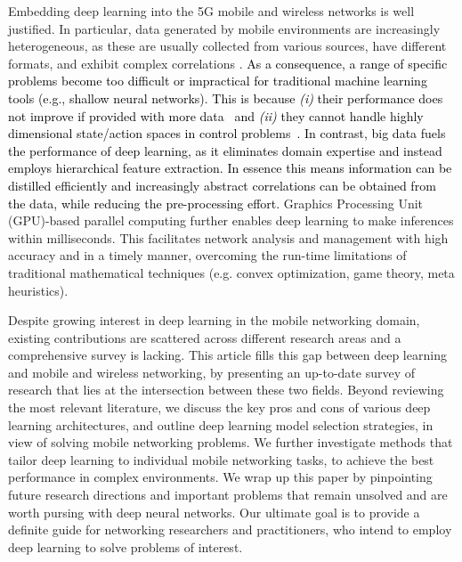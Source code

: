 \documentclass[journal,comsoc,letter]{IEEEtran}
\newcommand{\edit}[1]{\textcolor{black}{#1}}
\begin{document}
Embedding deep learning into the 5G mobile and wireless networks is well justified. In particular, data generated by mobile environments are increasingly heterogeneous, as these are usually collected from various sources, have different formats, and exhibit complex correlations \cite{alsheikh2016mobile}. 
\edit{As a consequence, a range of specific problems become too difficult or impractical for traditional machine learning tools (e.g., shallow neural networks). This is because \emph{(i)} their performance does not improve if provided with more data~\cite{goodfellow2016deep} and \emph{(ii)} they cannot handle highly dimensional state/action spaces in control problems~\cite{mnih2015human}. In contrast, big data fuels the performance of deep learning, as it eliminates domain expertise and instead employs hierarchical feature extraction. In essence this means information can be distilled efficiently and increasingly abstract correlations can be obtained from the data, while reducing the pre-processing effort.} Graphics Processing Unit (GPU)-based parallel computing further enables deep learning to make inferences within milliseconds. This facilitates network analysis and management with high accuracy and in a timely manner, overcoming the run-time limitations of traditional mathematical techniques (e.g. convex optimization, game theory, meta heuristics). 

Despite growing interest in deep learning in the mobile networking domain, existing contributions are scattered across different research areas and a comprehensive survey is lacking. This article fills this gap between deep learning and mobile and wireless networking, by presenting an up-to-date survey of research that lies at the intersection between these two fields. Beyond reviewing the most relevant literature, we discuss the key pros and cons of various deep learning architectures, and outline deep learning model selection strategies, in view of solving mobile networking problems. We further investigate methods that tailor deep learning to individual mobile networking tasks, to achieve the best performance in complex environments. We wrap up this paper by pinpointing future research directions and important problems that remain unsolved and are worth pursing with deep neural networks. Our ultimate goal is to provide a definite guide for networking researchers and practitioners, who intend to employ deep learning to solve problems of interest.
\vspace*{0.25em}
\end{document}
